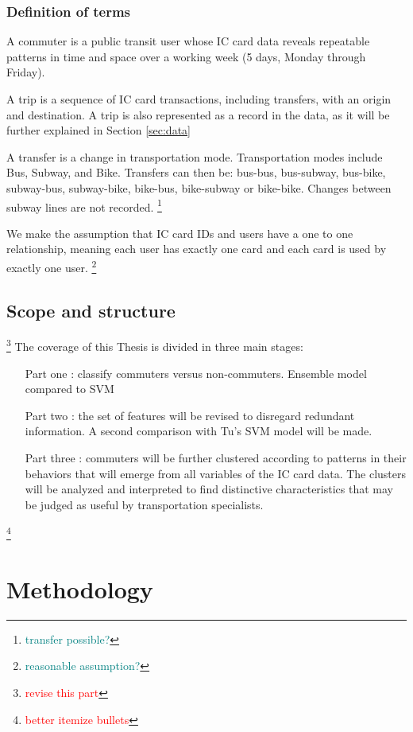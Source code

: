 \documentclass{article}
\newcommand{\selfnote}[1]{\footnote{\textcolor{red}{#1}}}
\newcommand{\domainDoubt}[1]{\footnote{\textcolor{teal}{#1}}}
\begin{document}
\subsubsection{Definition of terms}
A commuter is a public transit user whose IC card data reveals repeatable patterns in time and space over a working week (5 days, Monday through Friday).

A trip is a sequence of IC card transactions, including transfers, with an origin and destination. A trip is also represented as a record in the data, as it will be further explained in Section \ref{sec:data}

A transfer is a change in transportation mode. Transportation modes include Bus, Subway, and Bike. Transfers can then be: bus-bus, bus-subway, bus-bike, subway-bus, subway-bike, bike-bus, bike-subway or bike-bike. Changes between subway lines are not recorded. \domainDoubt{transfer possible?} 

We make the assumption that IC card IDs and users have a one to one relationship, meaning each user has exactly one card and each card is used by exactly one user. \domainDoubt{reasonable assumption?}

\subsection{Scope and structure}
\selfnote{revise this part}
The coverage of this Thesis is divided in three main stages: 

\begin{itemize}
\item[Part one]: classify commuters versus non-commuters. Ensemble model compared to SVM

\item[Part two]: the set of features will be revised to disregard redundant information. A second comparison with Tu\cite{tu2016impact}'s SVM model will be made. 

\item[Part three]: commuters will be further clustered according to patterns in their behaviors that will emerge from all variables of the IC card data. The clusters will be analyzed and interpreted to find distinctive characteristics that may be judged as useful by transportation specialists. 
\end{itemize}

\selfnote{better itemize bullets}


\newpage
\section{Methodology}
\end{document}
